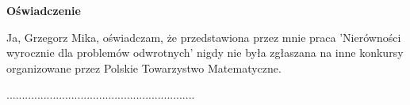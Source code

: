 \documentclass[]{article}
\begin{document}
\begin{center}
	\huge{{\bf Oświadczenie}}	
\end{center}
\vspace{1cm}
Ja, Grzegorz Mika, oświadczam, że przedstawiona przez mnie praca 'Nierówności wyrocznie dla problemów odwrotnych' nigdy nie była zgłaszana na inne konkursy organizowane przez Polskie Towarzystwo Matematyczne.
\vspace{2cm}
\begin{flushright}
	.............................................................
\end{flushright}
\end{document}
